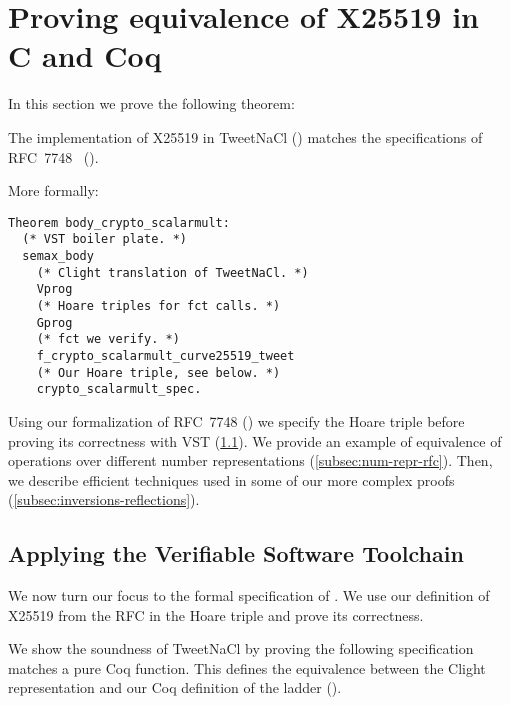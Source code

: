 \section{Proving equivalence of X25519 in C and Coq}
\label{sec:C-Coq}

In this section we prove the following theorem:

\begin{informaltheorem}
The implementation of X25519 in TweetNaCl () matches
the specifications of RFC~7748~\cite{rfc7748} ().
\end{informaltheorem}

More formally:
\begin{lstlisting}[language=Coq]
Theorem body_crypto_scalarmult:
  (* VST boiler plate. *)
  semax_body
    (* Clight translation of TweetNaCl. *)
    Vprog
    (* Hoare triples for fct calls. *)
    Gprog
    (* fct we verify. *)
    f_crypto_scalarmult_curve25519_tweet
    (* Our Hoare triple, see below. *)
    crypto_scalarmult_spec.
\end{lstlisting}

Using our formalization of RFC~7748 () we specify the Hoare
triple before proving its correctness with VST (\ref{subsec:with-VST}).
We provide an example of equivalence of operations over different number
representations (\ref{subsec:num-repr-rfc}). Then, we describe efficient techniques
used in some of our more complex proofs (\ref{subsec:inversions-reflections}).


\subsection{Applying the Verifiable Software Toolchain}
\label{subsec:with-VST}

We now turn our focus to the formal specification of .
We use our definition of X25519 from the RFC in the Hoare triple and prove
its correctness.

We show the soundness of TweetNaCl by proving the following specification matches
a pure Coq function.
This defines the equivalence between the Clight representation and our Coq
definition of the ladder ().


